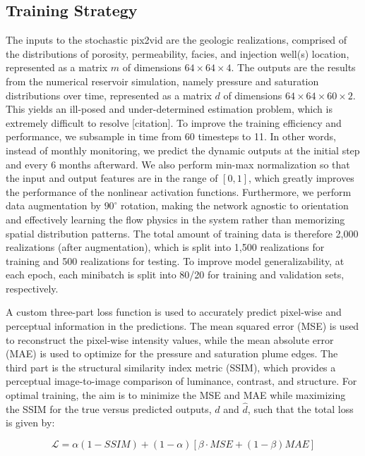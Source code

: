 \documentclass[default,iicol]{sn-jnl}
\begin{document}
\subsection{Training Strategy}\label{subsec2_train_strat}
The inputs to the stochastic pix2vid are the geologic realizations, comprised of the distributions of porosity, permeability, facies, and injection well(s) location, represented as a matrix $m$ of dimensions $64\times64\times4$. The outputs are the results from the numerical reservoir simulation, namely pressure and saturation distributions over time, represented as a matrix $d$ of dimensions $64\times64\times60\times2$. This yields an ill-posed and under-determined estimation problem, which is extremely difficult to resolve [citation]. To improve the training efficiency and performance, we subsample in time from 60 timesteps to 11. In other words, instead of monthly monitoring, we predict the dynamic outputs at the initial step and every 6 months afterward. We also perform min-max normalization so that the input and output features are in the range of $[0,1]$, which greatly improves the performance of the nonlinear activation functions. Furthermore, we perform data augmentation by $90^{\circ}$ rotation, making the network agnostic to orientation and effectively learning the flow physics in the system rather than memorizing spatial distribution patterns. The total amount of training data is therefore 2,000 realizations (after augmentation), which is split into 1,500 realizations for training and 500 realizations for testing. To improve model generalizability, at each epoch, each minibatch is split into 80/20 for training and validation sets, respectively. 

A custom three-part loss function is used to accurately predict pixel-wise and perceptual information in the predictions. The mean squared error (MSE) is used to reconstruct the pixel-wise intensity values, while the mean absolute error (MAE) is used to optimize for the pressure and saturation plume edges. The third part is the structural similarity index metric (SSIM), which provides a perceptual image-to-image comparison of luminance, contrast, and structure. For optimal training, the aim is to minimize the MSE and MAE while maximizing the SSIM for the true versus predicted outputs, $d$ and $\hat{d}$, such that the total loss is given by:

\begin{equation} \label{eq7}
    \mathcal{L} = \alpha(1-SSIM) + (1-\alpha)[\beta \cdot MSE + (1-\beta) MAE]
\end{equation}
\end{document}
